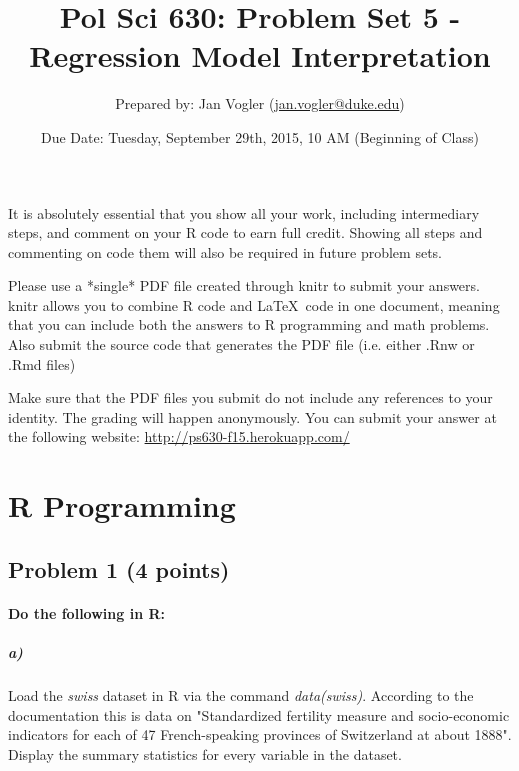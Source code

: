 \documentclass[12pt]{article}
\begin{document}
\title{Pol Sci 630: Problem Set 5 - Regression Model Interpretation}

\author{Prepared by: Jan Vogler (\href{mailto:jan.vogler@duke.edu}{jan.vogler@duke.edu})}

\date{Due Date: Tuesday, September 29th, 2015, 10 AM (Beginning of Class)}
 
\maketitle 



It is absolutely essential that you show all your work, including intermediary steps, and comment on your R code to earn full credit. Showing all steps and commenting on code them will also be required in future problem sets.

Please use a *single* PDF file created through knitr to submit your answers. knitr allows you to combine R code and \LaTeX \ code in one document, meaning that you can include both the answers to R programming and math problems. Also submit the source code that generates the PDF file (i.e. either .Rnw or .Rmd files)

Make sure that the PDF files you submit do not include any references to your identity. The grading will happen anonymously. You can submit your answer at the following website: \url{http://ps630-f15.herokuapp.com/}



\section*{R Programming}

\subsection*{Problem 1 (4 points)}

\paragraph{Do the following in R:}

\subparagraph{a)} Load the \textit{swiss} dataset in R via the command \textit{data(swiss)}. According to the documentation this is data on "Standardized fertility measure and socio-economic indicators for each of 47 French-speaking provinces of Switzerland at about 1888". Display the summary statistics for every variable in the dataset.
\end{document}
